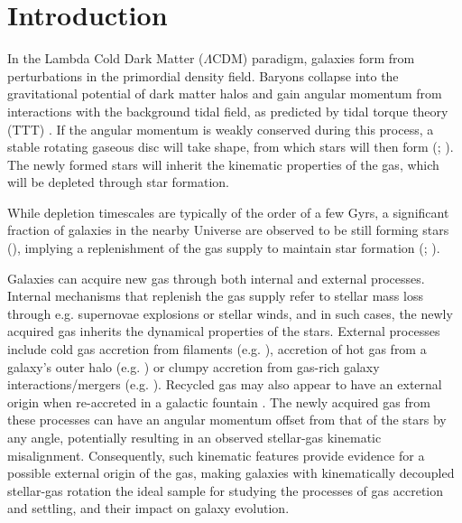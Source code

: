 \documentclass[fleqn,usenatbib]{mnras}
\begin{document}
\section{Introduction}
\label{sec:intro}
In the Lambda Cold Dark Matter ($\Lambda$CDM) paradigm, galaxies form from perturbations in the primordial density field. Baryons collapse into the gravitational potential of dark matter halos and gain angular momentum from interactions with the background tidal field, as predicted by tidal torque theory (TTT) \citep{Hoyle1951,peebles1969,Doroshkevich1970}. If the angular momentum is weakly conserved during this process, a stable rotating gaseous disc will take shape, from which stars will then form (\citealt{FallEfstathiou1980}; \citealt{Mo1998}). The newly formed stars will inherit the kinematic properties of the gas, which will be depleted through star formation.

While depletion timescales are typically of the order of a few Gyrs, a significant fraction of galaxies in the nearby Universe are observed to be still forming stars (\citealt*{KennicuttTamblynCongdon1994}), implying a replenishment of the gas supply to maintain star formation (\citealt*{PutmanPeekJong2012}; \citealt{SanchezAlmeida2014}).

Galaxies can acquire new gas through both internal and external processes. Internal mechanisms that replenish the gas supply refer to stellar mass loss through e.g. supernovae explosions or stellar winds, and in such cases, the newly acquired gas inherits the dynamical properties of the stars. External processes include cold gas accretion from filaments (e.g. \citealt{Keres2005,Chung2012}), accretion of hot gas from a galaxy's outer halo (e.g. \citealt{CdpLagos2015}) or clumpy accretion from gas-rich galaxy interactions/mergers (e.g. \citealt{DiTeodoro2014,Barreraballesteros2015}). Recycled gas may also appear to have an external origin when re-accreted in a galactic fountain \citep{HouckBregman1990}. The newly acquired gas from these processes can have an angular momentum offset from that of the stars by any angle, potentially resulting in an observed stellar-gas kinematic misalignment. Consequently, such kinematic features provide evidence for a possible external origin of the gas, making galaxies with kinematically decoupled stellar-gas rotation the ideal sample for studying the processes of gas accretion and settling, and their impact on galaxy evolution. 
\end{document}
